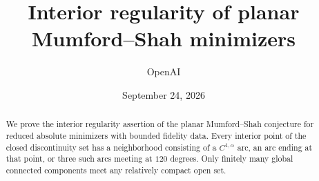\documentclass[11pt]{article}
\title{Interior regularity of planar\\Mumford--Shah minimizers}
\author{OpenAI}
\date{September 24, 2026}
\theoremstyle{definition}
\numberwithin{equation}{section}
\begin{document}
\maketitle
\begin{abstract}
We prove the interior regularity assertion of the planar Mumford--Shah
conjecture for reduced absolute minimizers with bounded fidelity data.
Every interior point of the closed discontinuity set has a neighborhood
consisting of a $C^{1,\alpha}$ arc, an arc ending at that point, or three
such arcs meeting at $120$ degrees. Only finitely many global connected
components meet any relatively compact open set.
\end{abstract}
\tableofcontents






\begingroup
\small


\endgroup
\end{document}
